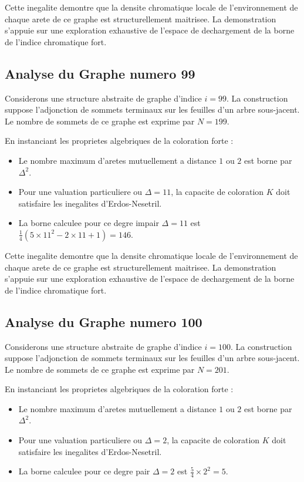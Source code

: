 \documentclass[11pt,a4paper]{article}
\begin{document}
Cette inegalite demontre que la densite chromatique locale de l'environnement de chaque arete de ce graphe est structurellement maitrisee. La demonstration s'appuie sur une exploration exhaustive de l'espace de dechargement de la borne de l'indice chromatique fort.

\subsection{Analyse du Graphe numero 99}
Considerons une structure abstraite de graphe d'indice $i = 99$. La construction suppose l'adjonction de sommets terminaux sur les feuilles d'un arbre sous-jacent. Le nombre de sommets de ce graphe est exprime par $N = 199$.

En instanciant les proprietes algebriques de la coloration forte :
\begin{itemize}
\item Le nombre maximum d'aretes mutuellement a distance $1$ ou $2$ est borne par $\Delta^2$.
\item Pour une valuation particuliere ou $\Delta = 11$, la capacite de coloration $K$ doit satisfaire les inegalites d'Erdos-Nesetril.
\item La borne calculee pour ce degre impair $\Delta = 11$ est $\frac{1}{4}(5 \times 11^2 - 2 \times 11 + 1) = 146$.
\end{itemize}

Cette inegalite demontre que la densite chromatique locale de l'environnement de chaque arete de ce graphe est structurellement maitrisee. La demonstration s'appuie sur une exploration exhaustive de l'espace de dechargement de la borne de l'indice chromatique fort.

\subsection{Analyse du Graphe numero 100}
Considerons une structure abstraite de graphe d'indice $i = 100$. La construction suppose l'adjonction de sommets terminaux sur les feuilles d'un arbre sous-jacent. Le nombre de sommets de ce graphe est exprime par $N = 201$.

En instanciant les proprietes algebriques de la coloration forte :
\begin{itemize}
\item Le nombre maximum d'aretes mutuellement a distance $1$ ou $2$ est borne par $\Delta^2$.
\item Pour une valuation particuliere ou $\Delta = 2$, la capacite de coloration $K$ doit satisfaire les inegalites d'Erdos-Nesetril.
\item La borne calculee pour ce degre pair $\Delta = 2$ est $\frac{5}{4} \times 2^2 = 5$.
\end{itemize}
\end{document}
